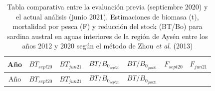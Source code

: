 \documentclass[
  spanish,
]{article}
\begin{document}
\pagebreak

\begin{longtable}[]{@{}ccccccc@{}}
\caption{\label{Tab8} Tabla comparativa entre la evaluación previa
(septiembre 2020) y el actual análisis (junio 2021). Estimaciones de
biomasa (t), mortalidad por pesca (F) y reducción del stock (BT/Bo) para
sardina austral en aguas interiores de la región de Aysén entre los años
2012 y 2020 según el método de Zhou \emph{et al}. (2013)}\tabularnewline
\toprule
\begin{minipage}[b]{0.05\columnwidth}\centering
Año\strut
\end{minipage} & \begin{minipage}[b]{0.12\columnwidth}\centering
\(BT_{sept20}\)\strut
\end{minipage} & \begin{minipage}[b]{0.11\columnwidth}\centering
\(BT_{jun21}\)\strut
\end{minipage} & \begin{minipage}[b]{0.16\columnwidth}\centering
\(BT/B_{0_{sept20}}\)\strut
\end{minipage} & \begin{minipage}[b]{0.15\columnwidth}\centering
\(BT/B_{0_{jun21}}\)\strut
\end{minipage} & \begin{minipage}[b]{0.11\columnwidth}\centering
\(F_{sept20}\)\strut
\end{minipage} & \begin{minipage}[b]{0.11\columnwidth}\centering
\(F_{jun21}\)\strut
\end{minipage}\tabularnewline
\midrule
\endfirsthead
\toprule
\begin{minipage}[b]{0.05\columnwidth}\centering
Año\strut
\end{minipage} & \begin{minipage}[b]{0.12\columnwidth}\centering
\(BT_{sept20}\)\strut
\end{minipage} & \begin{minipage}[b]{0.11\columnwidth}\centering
\(BT_{jun21}\)\strut
\end{minipage} & \begin{minipage}[b]{0.16\columnwidth}\centering
\(BT/B_{0_{sept20}}\)\strut
\end{minipage} & \begin{minipage}[b]{0.15\columnwidth}\centering
\(BT/B_{0_{jun21}}\)\strut
\end{minipage} & \begin{minipage}[b]{0.11\columnwidth}\centering

\end{minipage}
\end{longtable}
\end{document}
